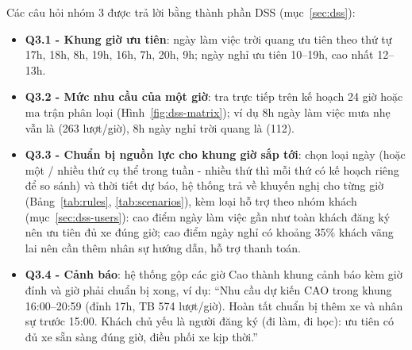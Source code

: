 Các câu hỏi nhóm 3 được trả lời bằng thành phần DSS (mục~\ref{sec:dss}):
\begin{itemize}
    \item \textbf{Q3.1 - Khung giờ ưu tiên}: ngày làm việc trời quang ưu tiên theo thứ tự 17h, 18h, 8h, 19h, 16h, 7h, 20h, 9h; ngày nghỉ ưu tiên 10--19h, cao nhất 12--13h.
    \item \textbf{Q3.2 - Mức nhu cầu của một giờ}: tra trực tiếp trên kế hoạch 24 giờ hoặc ma trận phân loại (Hình~\ref{fig:dss-matrix}); ví dụ 8h ngày làm việc mưa nhẹ vẫn là \High{} (263 lượt/giờ), 8h ngày nghỉ trời quang là \Med{} (112).
    \item \textbf{Q3.3 - Chuẩn bị nguồn lực cho khung giờ sắp tới}: chọn loại ngày (hoặc một / nhiều thứ cụ thể trong tuần - nhiều thứ thì mỗi thứ có kế hoạch riêng để so sánh) và thời tiết dự báo, hệ thống trả về khuyến nghị cho từng giờ (Bảng~\ref{tab:rules}, \ref{tab:scenarios}), kèm loại hỗ trợ theo nhóm khách (mục~\ref{sec:dss-users}): cao điểm ngày làm việc gần như toàn khách đăng ký nên ưu tiên đủ xe đúng giờ; cao điểm ngày nghỉ có khoảng 35\% khách vãng lai nên cần thêm nhân sự hướng dẫn, hỗ trợ thanh toán.
    \item \textbf{Q3.4 - Cảnh báo}: hệ thống gộp các giờ Cao thành khung cảnh báo kèm giờ đỉnh và giờ phải chuẩn bị xong, ví dụ: ``Nhu cầu dự kiến CAO trong khung 16:00--20:59 (đỉnh 17h, TB 574 lượt/giờ). Hoàn tất chuẩn bị thêm xe và nhân sự trước 15:00. Khách chủ yếu là người đăng ký (đi làm, đi học): ưu tiên có đủ xe sẵn sàng đúng giờ, điều phối xe kịp thời.''
\end{itemize}
